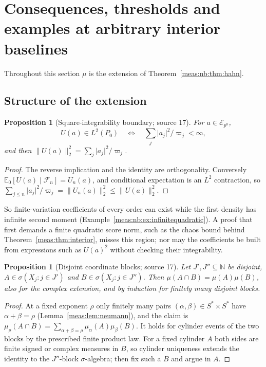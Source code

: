 \documentclass[11pt]{article}
\numberwithin{equation}{section}
\newtheorem{proposition}[theorem]{Proposition}
\theoremstyle{definition}
\theoremstyle{remark}
\newcommand{\N}{\mathbb N}
\newcommand{\E}{\mathbb E}
\newcommand{\norm}[1]{\lVert#1\rVert}
\newcommand{\abs}[1]{\lvert#1\rvert}
\newcommand{\Erow}{\mathcal E_{p^0}}
\begin{document}
\section{Consequences, thresholds and examples at arbitrary interior baselines}
\label{meas:nb:sec:examples}

Throughout this section $\mu$ is the extension of Theorem~\ref{meas:nb:thm:hahn}.

\subsection{Structure of the extension}

\begin{proposition}[Square-integrability boundary; source 17]\label{meas:nb:prop:L2}
For $a\in\Erow$,
\begin{equation}\label{meas:nb:eq:L2-score}
 U(a)\in L^2(P_0)\quad\Longleftrightarrow\quad\sum_j\abs{a_j}^2/\varpi_j<\infty,
\end{equation}
and then $\norm{U(a)}_2^2=\sum_j\abs{a_j}^2/\varpi_j$.
\end{proposition}
\begin{proof}
The reverse implication and the identity are orthogonality. Conversely
$\E_0[U(a)\mid\mathcal F_n]=U_n(a)$, and conditional expectation is an $L^2$
contraction, so $\sum_{j\le n}\abs{a_j}^2/\varpi_j=\norm{U_n(a)}_2^2\le\norm{U(a)}_2^2$.
\end{proof}

So finite-variation coefficients of every order can exist while the first density
has infinite second moment (Example~\ref{meas:nb:ex:infinitequadratic}). A proof that
first demands a finite quadratic score norm, such as the chaos bound behind
Theorem~\ref{meas:thm:interior}, misses this region; nor may the coefficients be built
from expressions such as $U(a)^2$ without checking their integrability.

\begin{proposition}[Disjoint coordinate blocks; source 17]\label{meas:nb:prop:blocks}
Let $J',J''\subseteq\N$ be disjoint, $A\in\sigma(X_j:j\in J')$ and
$B\in\sigma(X_j:j\in J'')$. Then $\mu(A\cap B)=\mu(A)\mu(B)$, also for the complex
extension, and by induction for finitely many disjoint blocks.
\end{proposition}
\begin{proof}
At a fixed exponent $\rho$ only finitely many pairs $(\alpha,\beta)\in S^*\times S^*$ have
$\alpha+\beta=\rho$ (Lemma~\ref{meas:lem:neumann}), and the claim is
$\mu_\rho(A\cap B)=\sum_{\alpha+\beta=\rho}\mu_\alpha(A)\mu_\beta(B)$. It holds for cylinder
events of the two blocks by the prescribed finite product law. For a fixed cylinder
$A$ both sides are finite signed or complex measures in $B$, so cylinder uniqueness
extends the identity to the $J''$-block $\sigma$-algebra; then fix such a $B$ and
argue in $A$.
\end{proof}
\end{document}
